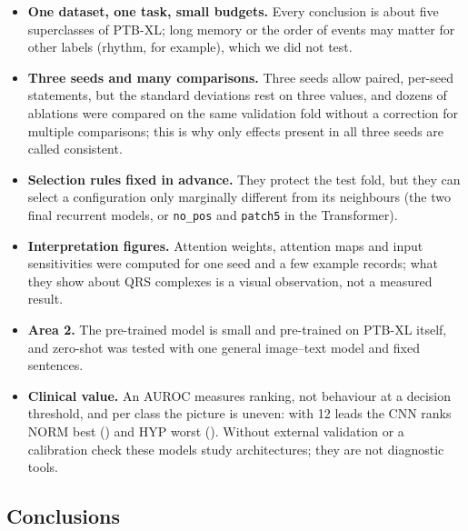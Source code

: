 \begin{itemize}[leftmargin=1.2em,itemsep=1pt]
  \item \textbf{One dataset, one task, small budgets.} Every conclusion is about five superclasses of
        PTB-XL; long memory or the order of events may matter for other labels (rhythm, for example),
        which we did not test.
  \item \textbf{Three seeds and many comparisons.} Three seeds allow paired, per-seed statements, but
        the standard deviations rest on three values, and dozens of ablations were compared on the same
        validation fold without a correction for multiple comparisons; this is why only effects present
        in all three seeds are called consistent.
  \item \textbf{Selection rules fixed in advance.} They protect the test fold, but they can select a
        configuration only marginally different from its neighbours (the two final recurrent models, or
        \texttt{no\_pos} and \texttt{patch5} in the Transformer).
  \item \textbf{Interpretation figures.} Attention weights, attention maps and input sensitivities were
        computed for one seed and a few example records; what they show about QRS complexes is a visual
        observation, not a measured result.
  \item \textbf{Area 2.} The pre-trained model is small and pre-trained on PTB-XL itself, and zero-shot
        was tested with one general image--text model and fixed sentences.
  \item \textbf{Clinical value.} An AUROC measures ranking, not behaviour at a decision threshold, and
        per class the picture is uneven: with 12 leads the CNN ranks NORM best
        (\comparisonTestAurocNORMMeanTwelveCnn{}) and HYP worst (\comparisonTestAurocHYPMeanTwelveCnn{}).
        Without external validation or a calibration check these models study architectures; they are
        not diagnostic tools.
\end{itemize}

\subsection{Conclusions}

